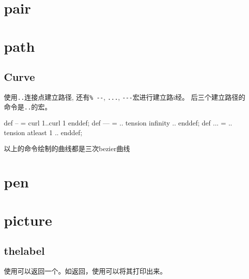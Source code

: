 
\section{pair}
\label{sec:pair}


\section{path}
\label{sec:path}

\subsection{Curve}

\mpost 使用{\macro\lstinline$..$}连接点建立路径, 还有{\macro\lstinline$%
--$}, {\macro\lstinline$...$}, {\macro\lstinline$---$}宏进行建立路i经。%
后三个建立路径的命令是{\marco\lstinline$..$}的宏。\par

\begin{center}
\begin{mpostcode}
def -- = {curl 1}..{curl 1} enddef;
def --- = .. tension infinity .. enddef;
def ... = .. tension atleast 1 .. enddef;
\end{mpostcode}
\end{center}

以上的命令绘制的曲线都是{\other 三次bezier曲线}


\section{pen}
\label{sec:pen}


\section{picture}

\subsection{thelabel}

使用可以返回一个。如返回，使用可以将其打印出来。

